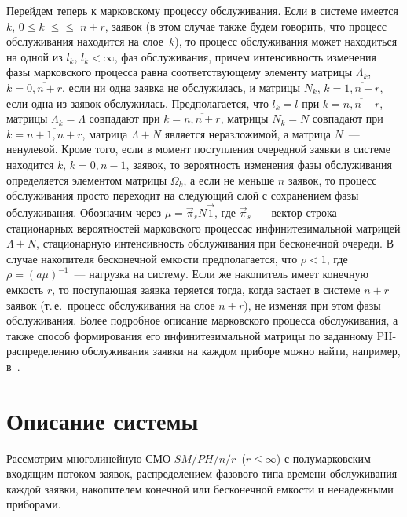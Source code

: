 \begin{multicols}{2}
Перейдем теперь к марковскому процессу обслуживания.
Если в системе имеется $k$,  $0\le k\;\le$\linebreak $\le\;n+r$, заявок (в этом
случае также будем говорить, что процесс обслуживания
находится на слое~$k$), то процесс обслуживания может находиться
на одной из $l_k$, $l_k<\infty$, фаз обслуживания, причем
интенсивность изменения фазы марковского процесса равна
соответствующему элементу матрицы
$\Lambda_k$, $k=\overline{0,n+r}$, если ни одна заявка не
обслужилась, и матрицы $N_k$, $k=\overline{1,n+r}$, если одна
из заявок обслужилась.
Предполагается, что $l_k=l$ при $k=\overline{n,n+r}$,
матрицы $\Lambda_k = \Lambda$ совпадают при $k=\overline{n,n+r}$,
матрицы $N_k = N$ совпадают при $k=\overline{n+1,n+r}$,
матрица $\Lambda+N$ является неразложимой, а матрица $N$~---
ненулевой.
Кроме того, если в момент поступления очередной заявки в системе
находится $k$, $k=\overline{0,n-1}$, заявок, то вероятность
изменения фазы обслуживания определяется элементом матрицы
$\Omega_k$, а если не меньше $n$ заявок, то процесс обслуживания
прос\-то переходит на следующий слой с сохранением фазы обслуживания.
Обозначим через $\mu = \vec \pi_s N \vec1$, где $\vec\pi_s$~---
вектор-строка стационарных вероятностей марковского процесса\linebreak с
инфинитезимальной матрицей $\Lambda+N$, стацио\-нарную
интенсивность обслуживания при бесконечной очереди.
В случае накопителя бесконечной %
емкости предполагается, что $\rho<1$,
где $\rho = (a \mu)^{-1}$~--- нагрузка на систему.
Если же накопитель имеет конечную емкость $r$, то поступающая
заявка теряется тогда, когда застает в системе $n+r$ заявок
(т.\,е.\ процесс обслуживания на слое $n+r$), не изменяя при этом
фазы обслуживания.
Более подробное описание марковского процесса обслуживания,
а также способ формирования его инфинитезимальной матрицы по
заданному PH-распределению обслуживания заявки на каждом приборе
можно найти, например, в~\cite{PC04,PC03}.

\section{Описание системы}

Рассмотрим многолинейную СМО $SM/PH/n/r$\  ($r\le \infty$) с
полумарковским входящим потоком заявок, распределением фазового
типа времени обслуживания каждой заявки, накопителем конечной
или бесконечной емкости и ненадежными приборами.


\end{multicols}
